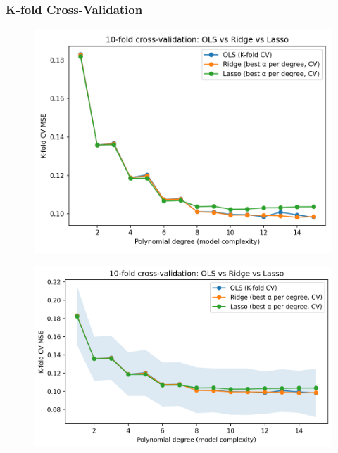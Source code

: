 \documentclass[amssymb,twocolumn,aps]{revtex4-2}
\begin{document}
\subsubsection{K-fold Cross-Validation}

\begin{figure}[H]
    \centering
    \includegraphics[width=1\linewidth]{Project-1/Figures/cv_mse_k10.png}
    \caption{}
    \label{fig:}
\end{figure}

\begin{figure}[H]
    \centering
    \includegraphics[width=1\linewidth]{Project-1/Figures/cv_mse.png}
    \caption{}
    \label{fig:}
\end{figure}
\end{document}
